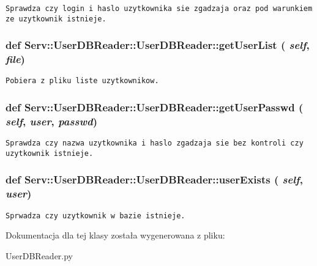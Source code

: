 \footnotesize\begin{verbatim}Sprawdza czy login i haslo uzytkownika sie zgadzaja oraz pod warunkiem ze uzytkownik istnieje.\end{verbatim}
\normalsize
 \hypertarget{class_serv_1_1_user_d_b_reader_1_1_user_d_b_reader_84890922ae8efd8ecec178874ec296f6}{
\subsubsection[{getUserList}]{\setlength{\rightskip}{0pt plus 5cm}def Serv::UserDBReader::UserDBReader::getUserList ( {\em self}, \/   {\em file})}}
\label{class_serv_1_1_user_d_b_reader_1_1_user_d_b_reader_84890922ae8efd8ecec178874ec296f6}




\footnotesize\begin{verbatim}Pobiera z pliku liste uzytkownikow.\end{verbatim}
\normalsize
 \hypertarget{class_serv_1_1_user_d_b_reader_1_1_user_d_b_reader_d77c35dbbb9ddf154ab8809463a254c0}{
\subsubsection[{getUserPasswd}]{\setlength{\rightskip}{0pt plus 5cm}def Serv::UserDBReader::UserDBReader::getUserPasswd ( {\em self}, \/   {\em user}, \/   {\em passwd})}}
\label{class_serv_1_1_user_d_b_reader_1_1_user_d_b_reader_d77c35dbbb9ddf154ab8809463a254c0}




\footnotesize\begin{verbatim}Sprawdza czy nazwa uzytkownika i haslo zgadzaja sie bez kontroli czy uzytkownik istnieje.\end{verbatim}
\normalsize
 \hypertarget{class_serv_1_1_user_d_b_reader_1_1_user_d_b_reader_e3a006e064956d5d09ad1bcaa4c3315f}{
\subsubsection[{userExists}]{\setlength{\rightskip}{0pt plus 5cm}def Serv::UserDBReader::UserDBReader::userExists ( {\em self}, \/   {\em user})}}
\label{class_serv_1_1_user_d_b_reader_1_1_user_d_b_reader_e3a006e064956d5d09ad1bcaa4c3315f}




\footnotesize\begin{verbatim}Sprwadza czy uzytkownik w bazie istnieje.\end{verbatim}
\normalsize
 

Dokumentacja dla tej klasy została wygenerowana z pliku:\begin{CompactItemize}
\item 
UserDBReader.py\end{CompactItemize}
